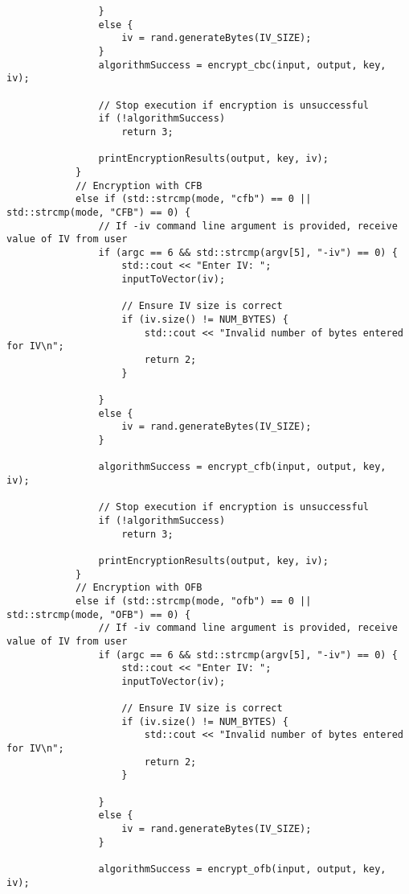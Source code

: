 \documentclass[a4paper,12pt]{article}
\begin{document}
{\begin{lstlisting}
                }
                else {
                    iv = rand.generateBytes(IV_SIZE);
                }
                algorithmSuccess = encrypt_cbc(input, output, key, iv);

                // Stop execution if encryption is unsuccessful
                if (!algorithmSuccess)
                    return 3;

                printEncryptionResults(output, key, iv);
            }
            // Encryption with CFB
            else if (std::strcmp(mode, "cfb") == 0 || std::strcmp(mode, "CFB") == 0) {
                // If -iv command line argument is provided, receive value of IV from user
                if (argc == 6 && std::strcmp(argv[5], "-iv") == 0) {
                    std::cout << "Enter IV: ";
                    inputToVector(iv);

                    // Ensure IV size is correct
                    if (iv.size() != NUM_BYTES) {
                        std::cout << "Invalid number of bytes entered for IV\n";
                        return 2;
                    }

                }
                else {
                    iv = rand.generateBytes(IV_SIZE);
                }

                algorithmSuccess = encrypt_cfb(input, output, key, iv);

                // Stop execution if encryption is unsuccessful
                if (!algorithmSuccess)
                    return 3;

                printEncryptionResults(output, key, iv);
            }
            // Encryption with OFB
            else if (std::strcmp(mode, "ofb") == 0 || std::strcmp(mode, "OFB") == 0) {
                // If -iv command line argument is provided, receive value of IV from user
                if (argc == 6 && std::strcmp(argv[5], "-iv") == 0) {
                    std::cout << "Enter IV: ";
                    inputToVector(iv);

                    // Ensure IV size is correct
                    if (iv.size() != NUM_BYTES) {
                        std::cout << "Invalid number of bytes entered for IV\n";
                        return 2;
                    }

                }
                else {
                    iv = rand.generateBytes(IV_SIZE);
                }

                algorithmSuccess = encrypt_ofb(input, output, key, iv);


\end{lstlisting}}
\end{document}
